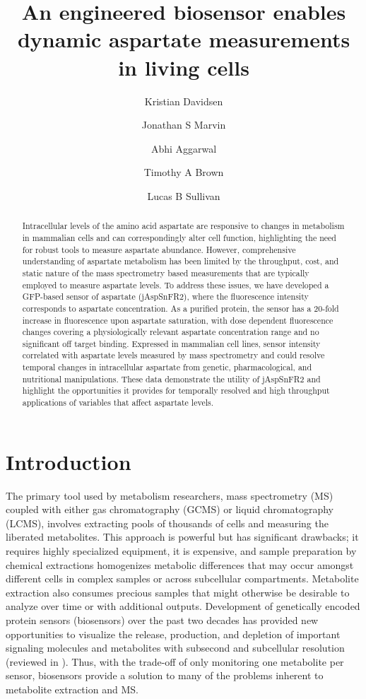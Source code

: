 \documentclass[9pt,lineno]{elife}
\title{An engineered biosensor enables dynamic aspartate measurements in living cells}
\author[1,2,\authfn{1}]{Kristian Davidsen}
\author[3,\authfn{1}*]{Jonathan S Marvin}
\author[3]{Abhi Aggarwal}
\author[3]{Timothy A Brown}
\author[1*]{Lucas B Sullivan}
\affil[1]{Human Biology Division, Fred Hutchinson Cancer Center, Seattle, WA, USA}
\affil[2]{Molecular and cellular biology program, University of Washington, Seattle, WA, USA}
\affil[3]{Howard Hughes Medical Institute (HHMI), Janelia Research Campus, Ashburn, VA, USA}
\begin{document}
\maketitle

\begin{abstract}
Intracellular levels of the amino acid aspartate are responsive to changes in metabolism in mammalian cells and can correspondingly alter cell function, highlighting the need for robust tools to measure aspartate abundance.
However, comprehensive understanding of aspartate metabolism has been limited by the throughput, cost, and static nature of the mass spectrometry based measurements that are typically employed to measure aspartate levels.
To address these issues, we have developed a GFP-based sensor of aspartate (jAspSnFR2), where the fluorescence intensity corresponds to aspartate concentration.
As a purified protein, the sensor has a 20-fold increase in fluorescence upon aspartate saturation, with dose dependent fluorescence changes covering a physiologically relevant aspartate concentration range and no significant off target binding.
Expressed in mammalian cell lines, sensor intensity correlated with aspartate levels measured by mass spectrometry and could resolve temporal changes in intracellular aspartate from genetic, pharmacological, and nutritional manipulations.
These data demonstrate the utility of jAspSnFR2 and highlight the opportunities it provides for temporally resolved and high throughput applications of variables that affect aspartate levels.
\end{abstract}


\section{Introduction}
The primary tool used by metabolism researchers, mass spectrometry (MS) coupled with either gas chromatography (GCMS) or liquid chromatography (LCMS), involves extracting pools of thousands of cells and measuring the liberated metabolites.
This approach is powerful but has significant drawbacks; it requires highly specialized equipment, it is expensive, and sample preparation by chemical extractions homogenizes metabolic differences that may occur amongst different cells in complex samples or across subcellular compartments.
Metabolite extraction also consumes precious samples that might otherwise be desirable to analyze over time or with additional outputs.
Development of genetically encoded protein sensors (biosensors) over the past two decades has provided new opportunities to visualize the release, production, and depletion of important signaling molecules and metabolites with subsecond and subcellular resolution (reviewed in \cite{Kostyuk2019-qc, Koveal2020-cl}).
Thus, with the trade-off of only monitoring one metabolite per sensor, biosensors provide a solution to many of the problems inherent to metabolite extraction and MS.
\end{document}
